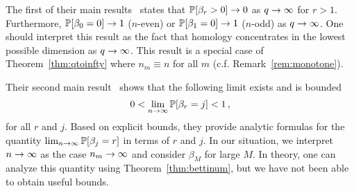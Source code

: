 The first of their
main results~\cite[Thm 2.1]{ginzburg2017random} states that
$\mathbb{P}[\beta_r > 0] \rightarrow 0$ as $q \rightarrow \infty$ for $r>1$. Furthermore,
$\mathbb{P}[\beta_0 = 0] \rightarrow 1$ ($n$-even) or $\mathbb{P}[\beta_1 = 0] \rightarrow 1$ ($n$-odd)
as $q \rightarrow \infty$. One should interpret this result as the fact that
homology concentrates in the lowest possible dimension as $q \rightarrow \infty$.
This result is a special case of Theorem~\ref{thm:qtoinfty} 
where $n_m \equiv n$ for all $m$ (c.f. Remark~\ref{rem:monotone}).

Their second main result~\cite[Thm 2.2]{ginzburg2017random} shows that 
the following limit exists and is bounded
\[
  0 < \lim_{n \rightarrow \infty} \mathbb{P}[\beta_r = j] < 1 \, ,
\]
for all $r$ and $j$. Based on explicit bounds, they provide analytic
formulas for the quantity $\lim_{n\rightarrow \infty}\mathbb{P}[\beta_j=r]$ in terms
of $r$ and $j$. In our situation, we interpret $n \rightarrow \infty$ as the case
$n_m \rightarrow \infty$ and consider $\beta_M$ for large $M$. In theory,
one can analyze this quantity using Theorem~\ref{thm:bettinum},
but we have not been able to obtain useful bounds.
